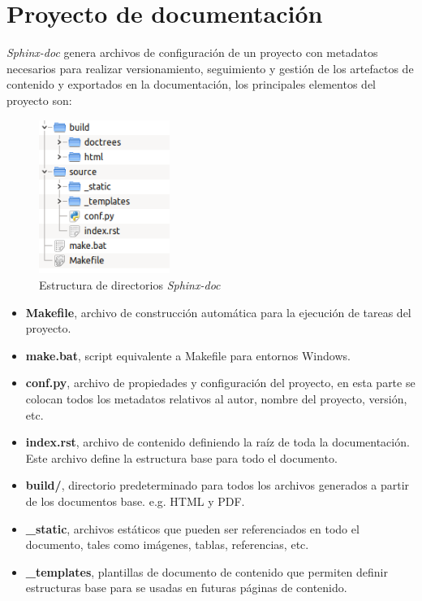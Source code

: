 \documentclass{sig-alternate}
\begin{document}
\section{Proyecto de documentaci\'on}

	\emph{Sphinx-doc} genera archivos de configuraci\'on de un proyecto 
	con metadatos necesarios para realizar versionamiento, seguimiento
	y gesti\'on de los artefactos de contenido y exportados en 
	la documentaci\'on, los principales elementos del proyecto 
	son:
	
	\begin{figure}[!htbp]
	  \centerline{\includegraphics[height=5cm]{dir_structure.png}}
	  \caption{Estructura de directorios \emph{Sphinx-doc}}
	\end{figure}
	
	\begin{itemize}
	 \item \textbf{Makefile}, archivo de construcci\'on
	    autom\'atica para la ejecuci\'on de tareas del proyecto.
	 \item \textbf{make.bat}, script equivalente a Makefile 
	    para entornos Windows.
	 \item \textbf{conf.py}, archivo de propiedades y configuraci\'on
	    del proyecto, en esta parte se colocan todos los metadatos
	    relativos al autor, nombre del proyecto, versi\'on, etc.
	 \item \textbf{index.rst}, archivo de contenido definiendo 
	    la ra\'iz de toda la documentaci\'on. Este archivo define
	    la estructura base para todo el documento.
	 \item \textbf{build/}, directorio predeterminado para todos 
	    los archivos generados a partir de los documentos 
	    base. e.g. HTML y PDF.
	  \item \textbf{\_static}, archivos est\'aticos que pueden ser 
	    referenciados en todo el documento, tales como im\'agenes,
	    tablas, referencias, etc.
	  \item \textbf{\_templates}, plantillas de documento de contenido
	    que permiten definir estructuras base para se usadas en futuras
	    p\'aginas de contenido.
	\end{itemize}
\end{document}
